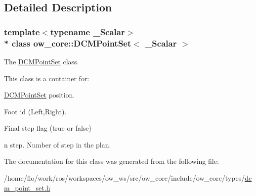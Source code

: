\subsection{Detailed Description}
\subsubsection*{template$<$typename \+\_\+\+Scalar$>$\\*
class ow\+\_\+core\+::\+D\+C\+M\+Point\+Set$<$ \+\_\+\+Scalar $>$}

The \hyperlink{classow__core_1_1DCMPointSet}{D\+C\+M\+Point\+Set} class. 

This class is a container for\+:
\begin{DoxyItemize}
\item \hyperlink{classow__core_1_1DCMPointSet}{D\+C\+M\+Point\+Set} position.
\item Foot id (Left,Right).
\item Final step flag (true or false)
\item n step. Number of step in the plan. 
\end{DoxyItemize}

The documentation for this class was generated from the following file\+:\begin{DoxyCompactItemize}
\item 
/home/flo/work/ros/workspaces/ow\+\_\+ws/src/ow\+\_\+core/include/ow\+\_\+core/types/\hyperlink{dcm__point__set_8h}{dcm\+\_\+point\+\_\+set.\+h}\end{DoxyCompactItemize}
